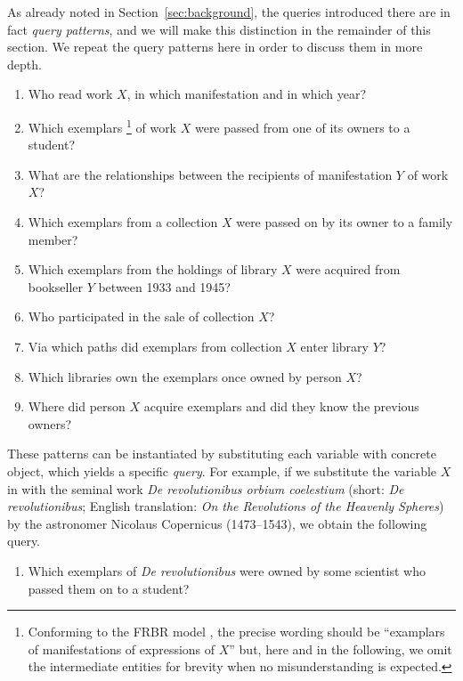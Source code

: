 As already noted in Section~\ref{sec:background}, the queries introduced there
are in fact \emph{query patterns}, and we will make this distinction in the remainder
of this section. We repeat the query patterns here in order to discuss them in more depth.
%
\begin{enumerate}
  \item[\exaquery{1}]
    Who read %
    work $X$, in which manifestation and in which year?
  \item[\exaquery{2}]
    Which exemplars%
    \footnote{%
      Conforming to the FRBR model \autocite{FRBR1998},
      the precise wording should be \enquote{examplars of manifestations of expressions of $X$}
      but, here and in the following,
      we omit the intermediate entities for brevity when no misunderstanding is expected.%
    }
    of work $X$
    were passed from one of its owners to a student?
  \item[\exaquery{3}]
    What are the relationships between the recipients of manifestation $Y$ of work $X$?
  \item[\exaquery{4}]
    Which exemplars from a collection $X$ were passed on by its owner to a family member?
  \item[\exaquery{5}]
    Which exemplars from the holdings of library $X$ were acquired from bookseller $Y$
    between 1933 and 1945?
  \item[\exaquery{6}]
    Who participated in the sale of collection $X$?
  \item[\exaquery{7}]
    Via which paths did exemplars from collection $X$ enter library $Y$?
  \item[\exaquery{8}]
    Which libraries own the exemplars once owned by person $X$?
  \item[\exaquery{9}]
    Where did person $X$ acquire exemplars and did they know the previous owners?
\end{enumerate}
%
These patterns can be instantiated by substituting each variable with concrete object,
which yields a specific \emph{query}. For example, if we substitute the variable $X$
in  with the seminal work \emph{De revolutionibus orbium coelestium}
(short: \emph{De revolutionibus}; English translation: \emph{On the Revolutions of the Heavenly Spheres}) \autocite{Kopernikus1543}
by the astronomer Nicolaus Copernicus (1473–1543),
we obtain the following query.
%
\begin{enumerate}
  \item[\exaquery{2$'$}]
    Which exemplars of \emph{De revolutionibus} were owned by some scientist who passed them on to a student?
\end{enumerate}
